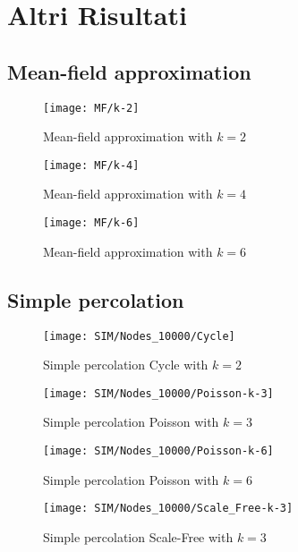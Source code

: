 \section{Altri Risultati}\label{sec:altri-risultati}
\subsection{Mean-field approximation}\label{subsec:app-mean-field-approximation}
    \begin{figure}[H]
        \texttt{[image: MF/k-2]}\caption{Mean-field approximation with $k=2$}
        \label{fig:mf_k_2}
    \end{figure}
    \begin{figure}[H]
        \texttt{[image: MF/k-4]}\caption{Mean-field approximation with $k=4$}
        \label{fig:mf_k_4}
    \end{figure}
    \begin{figure}[H]
        \texttt{[image: MF/k-6]}\caption{Mean-field approximation with $k=6$}
        \label{fig:mf_k_6}
    \end{figure}

\subsection{Simple percolation}\label{subsec:app-simple-percolation}
    \begin{figure}[H]
        \texttt{[image: SIM/Nodes\_10000/Cycle]}\caption{Simple percolation Cycle with $k=2$}
        \label{fig:sim_cycle}
    \end{figure}
    \begin{figure}[H]
        \texttt{[image: SIM/Nodes\_10000/Poisson-k-3]}\caption{Simple percolation Poisson with $k=3$}
        \label{fig:sim_poisson_k_3}
    \end{figure}
    \begin{figure}[H]
        \texttt{[image: SIM/Nodes\_10000/Poisson-k-6]}\caption{Simple percolation Poisson with $k=6$}
        \label{fig:sim_poisson_k_6}
    \end{figure}
    \begin{figure}[H]
        \texttt{[image: SIM/Nodes\_10000/Scale\_Free-k-3]}\caption{Simple percolation Scale-Free with $k=3$}
        \label{fig:sim_scale_free_k_3}
    \end{figure}


